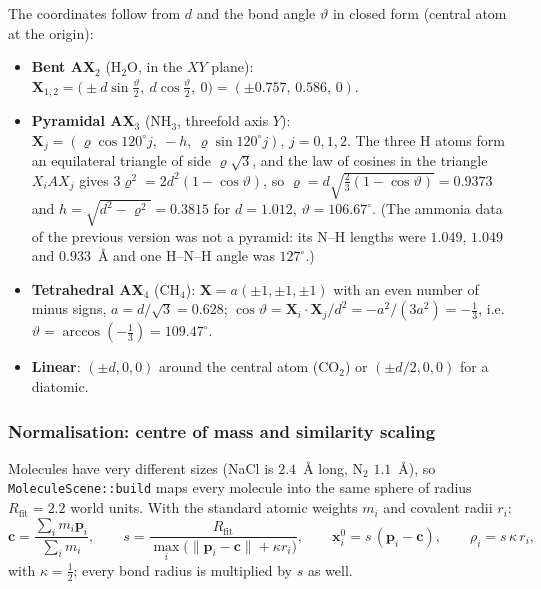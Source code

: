 \documentclass[a4paper, 11pt]{article}
\newcommand{\code}[1]{\texttt{#1}}
\begin{document}
The coordinates follow from $d$ and the bond angle $\vartheta$ in closed form (central atom at the origin):
\begin{itemize}
  \item \textbf{Bent AX$_2$} (H$_2$O, in the $XY$ plane): $\mathbf X_{1,2}=\bigl(\pm d\sin\tfrac\vartheta2,\ d\cos\tfrac\vartheta2,\ 0\bigr)=(\pm0.757,\,0.586,\,0)$.
  \item \textbf{Pyramidal AX$_3$} (NH$_3$, threefold axis $Y$): $\mathbf X_j=(\varrho\cos120^\circ j,\ -h,\ \varrho\sin120^\circ j)$, $j=0,1,2$.
        The three H atoms form an equilateral triangle of side $\varrho\sqrt3$, and the law of cosines in the triangle $X_iAX_j$ gives
        $3\varrho^2=2d^2(1-\cos\vartheta)$, so
        $\varrho=d\sqrt{\tfrac23(1-\cos\vartheta)}=0.9373$ and $h=\sqrt{d^2-\varrho^2}=0.3815$ for $d=1.012$, $\vartheta=106.67^\circ$.
        (The ammonia data of the previous version was not a pyramid: its N--H lengths were $1.049$, $1.049$ and $0.933$~{\AA} and one H--N--H
        angle was $127^\circ$.)
  \item \textbf{Tetrahedral AX$_4$} (CH$_4$): $\mathbf X=a(\pm1,\pm1,\pm1)$ with an even number of minus signs, $a=d/\sqrt3=0.628$;
        $\cos\vartheta=\mathbf X_i\cdot\mathbf X_j/d^2=-a^2/(3a^2)=-\tfrac13$, i.e.\ $\vartheta=\arccos(-\tfrac13)=109.47^\circ$.
  \item \textbf{Linear}: $(\pm d,0,0)$ around the central atom (CO$_2$) or $(\pm d/2,0,0)$ for a diatomic.
\end{itemize}

\subsubsection{Normalisation: centre of mass and similarity scaling}\label{sec:norm}

Molecules have very different sizes (NaCl is $2.4$~{\AA} long, N$_2$ $1.1$~{\AA}), so \code{MoleculeScene::build} maps every molecule
into the same sphere of radius $R_{\text{fit}}=2.2$ world units. With the standard atomic weights $m_i$ and covalent radii $r_i$:
\begin{equation}
  \mathbf c=\frac{\sum_i m_i\mathbf p_i}{\sum_i m_i},\qquad
  s=\frac{R_{\text{fit}}}{\max_i\bigl(\|\mathbf p_i-\mathbf c\|+\kappa r_i\bigr)},\qquad
  \mathbf x_i^0=s\,(\mathbf p_i-\mathbf c),\qquad \rho_i=s\,\kappa\,r_i,
  \label{eq:norm}
\end{equation}
with $\kappa=\tfrac12$; every bond radius is multiplied by $s$ as well.
\end{document}
